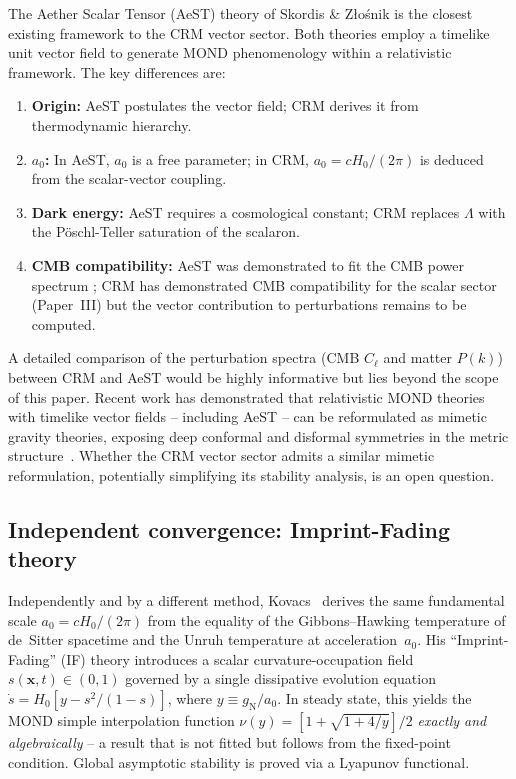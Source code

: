\documentclass[aps,prd,twocolumn,superscriptaddress,nofootinbib]{revtex4-2}
\begin{document}
The Aether Scalar Tensor (AeST) theory of Skordis \& Z{\l}o\'snik \cite{Skordis2021} is the closest existing framework to the CRM vector sector. Both theories employ a timelike unit vector field to generate MOND phenomenology within a relativistic framework. The key differences are:

\begin{enumerate}
\item \textbf{Origin:} AeST postulates the vector field; CRM derives it from thermodynamic hierarchy.
\item \textbf{$a_0$:} In AeST, $a_0$ is a free parameter; in CRM, $a_0 = cH_0/(2\pi)$ is deduced from the scalar-vector coupling.
\item \textbf{Dark energy:} AeST requires a cosmological constant; CRM replaces $\Lambda$ with the P\"oschl-Teller saturation of the scalaron.
\item \textbf{CMB compatibility:} AeST was demonstrated to fit the CMB power spectrum \cite{Skordis2021}; CRM has demonstrated CMB compatibility for the scalar sector (Paper~III) but the vector contribution to perturbations remains to be computed.
\end{enumerate}

A detailed comparison of the perturbation spectra (CMB $C_\ell$ and matter $P(k)$) between CRM and AeST would be highly informative but lies beyond the scope of this paper. Recent work has demonstrated that relativistic MOND theories with timelike vector fields -- including AeST -- can be reformulated as mimetic gravity theories, exposing deep conformal and disformal symmetries in the metric structure~\cite{MimeticMOND2024}. Whether the CRM vector sector admits a similar mimetic reformulation, potentially simplifying its stability analysis, is an open question.

\subsection{Independent convergence: Imprint-Fading theory}

Independently and by a different method, Kovacs~\cite{Kovacs2026} derives the same fundamental scale $a_0 = cH_0/(2\pi)$ from the equality of the Gibbons--Hawking temperature of de~Sitter spacetime and the Unruh temperature at acceleration~$a_0$. His ``Imprint-Fading'' (IF) theory introduces a scalar curvature-occupation field $s(\mathbf{x},t) \in (0,1)$ governed by a single dissipative evolution equation $\dot{s} = H_0[y - s^2/(1-s)]$, where $y \equiv g_\mathrm{N}/a_0$. In steady state, this yields the MOND simple interpolation function $\nu(y) = [1 + \sqrt{1+4/y}]/2$ \emph{exactly and algebraically} -- a result that is not fitted but follows from the fixed-point condition. Global asymptotic stability is proved via a Lyapunov functional.
\end{document}
